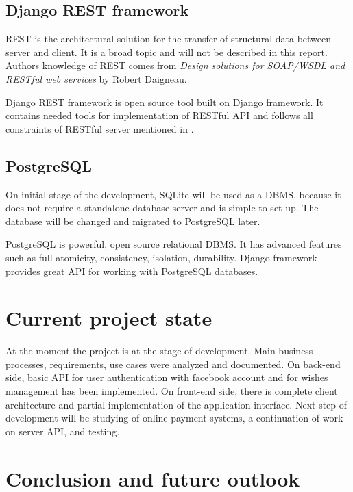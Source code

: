 \documentclass[12pt,a4paper]{report}
\begin{document}
	
	\subsection{Django REST framework}
	
\ac{REST}\cite{rest} is the architectural solution for the transfer of structural data between server and client. It is a broad topic and will not be described in this report. Authors knowledge of \ac{REST} comes from \textit{Design solutions for SOAP/WSDL and RESTful web services} by Robert Daigneau\cite{rest}.\par
Django REST framework is open source tool built on Django framework. It contains needed tools for implementation of \ac{REST}ful \ac{API} and follows all constraints of \ac{REST}ful server mentioned in \cite{rest}.

	
	\subsection{PostgreSQL}

On initial stage of the development, SQLite will be used as a \ac{DBMS}, because it does not require a standalone database server and is simple to set up. The database will be changed and migrated to PostgreSQL later.\par
PostgreSQL\cite{postgres} is powerful, open source relational \ac{DBMS}. It has advanced features such as full atomicity, consistency, isolation, durability. Django framework provides great \ac{API} for working with PostgreSQL databases.
	


\section{Current project state}

At the moment the project is at the stage of development. Main business processes, requirements, use cases were analyzed and documented. On back-end side, basic \ac{API} for user authentication with facebook account and for wishes management has been implemented. On front-end side, there is complete client architecture and partial implementation of the application interface.
Next step of development will be studying of online payment systems, a continuation of work on server \ac{API}, and testing.



\section{Conclusion and future outlook}
\end{document}
